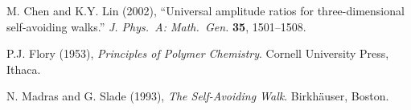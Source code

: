 \documentclass[12pt]{article}
\begin{document}
\begin{thebibliography}{99}

  M. Chen and K.Y. Lin (2002), ``Universal amplitude ratios for three-dimensional
self-avoiding walks.''  \textit{J. Phys.\ A:  Math.\ Gen.} \textbf{35}, 1501--1508.


  P.J. Flory (1953), \textit{Principles of Polymer Chemistry}.  Cornell University Press, Ithaca.

  N. Madras and G. Slade (1993), \textit{The Self-Avoiding Walk}.  Birkh\"{a}user, Boston.


\end{thebibliography}
\end{document}
